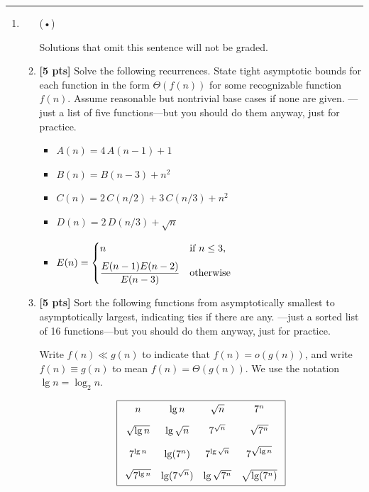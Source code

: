 \documentclass[11pt]{article}
\begin{document}
\hrule

\newpage
\begin{enumerate}
\parindent 1.5em \itemsep 4ex plus 0.5fil

\item
\begin{enumerate}\itemsep 2ex plus 0.1fil
\item[(•)]
\textcolor{red}{}

Solutions that omit this sentence will not be graded.

\item
\textbf{[5 pts]}
Solve the following recurrences.  State tight asymptotic bounds for each function in the form $\Theta(f(n))$ for some recognizable function $f(n)$.  Assume reasonable but nontrivial base cases if none are given.  ---just a list of five functions---but you should do them anyway, just for practice.
\medskip
\begin{itemize}\itemsep 1ex
\item
$A(n) = 4\,A(n-1) + 1$
\item
$B(n) = B(n-3) + n^2$
\item
$C(n) = 2\, C(n/2) + 3\, C(n/3) + n^2$
\item
$D(n) = 2\, D(n/3) + \sqrt{n}$
\item
$E(n) = \begin{cases}
	n & \text{if $n\le 3$,} \\[1.5ex]
	{\displaystyle\frac{E(n-1)E(n-2)}{E(n-3)}} & \text{otherwise}
\end{cases}$\qquad
{}
\end{itemize}


\item
\textbf{[5 pts]}
Sort the following functions from asymptotically smallest to asymptotically largest, indicating ties if there are any.   ---just a sorted list of 16 functions---but you should do them anyway, just for practice.

\quad Write $f(n) \ll g(n)$ to indicate that $f(n) = o(g(n))$, and write $f(n) \equiv g(n)$ to mean $f(n) = \Theta(g(n))$.  We use the notation $\lg n = \log_2 n$.

\[
\mfbox{
\begin{array}{c@{\quad}c@{\quad}c@{\quad}c}
		n &
		\lg n &
		\sqrt{n}  &
		7^n
	\\[2ex]
		\sqrt{\lg n} &
		\lg \sqrt{n} &
		7^{\sqrt{n}}  &
		\sqrt{7^n}
	\\[2ex]
		7^{\lg n} &
		\lg(7^n) &
		7^{\lg \sqrt{n}} &
		7^{\sqrt{\lg n}} 
	\\[2ex]
		\sqrt{7^{\lg n}} &
		\lg (7^{\sqrt{n}})  &
		\lg \sqrt{7^n}  &
		\sqrt{\lg (7^n)}
\end{array}}
\]


\end{enumerate}
\end{enumerate}
\end{document}
